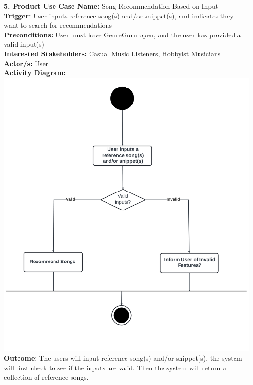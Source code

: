\documentclass[12pt]{article}
\begin{document}
\noindent \textbf{5. Product Use Case Name:} Song Recommendation Based on Input \\
\textbf{Trigger:} User inputs reference song(s) and/or snippet(s), and indicates they want to search for recommendations \\
\textbf{Preconditions:} User must have GenreGuru open, and the user has provided a valid input(s) \\
\textbf{Interested Stakeholders:} Casual Music Listeners, Hobbyist Musicians \\
\textbf{Actor/s:} User \\
\textbf{Activity Diagram:} \\
\includegraphics[width=\textwidth]{recommend_song.png} \\
\textbf{Outcome:} The users will input reference song(s) and/or snippet(s), the system will first check to see if the inputs are valid. Then the system will return a collection of reference songs.

\vspace{1cm}
\end{document}
